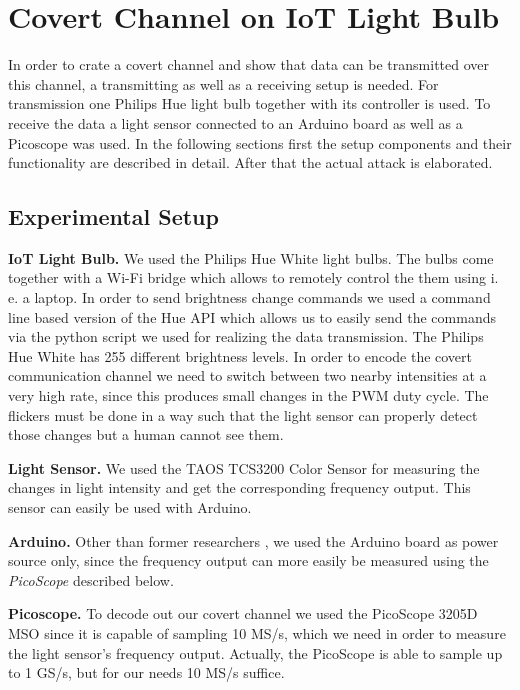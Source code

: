 \section{Covert Channel on IoT Light Bulb}
\label{sec:experiment}

In order to crate a covert channel and show that data can be transmitted over this channel, a transmitting as well as a receiving setup is needed. For transmission one Philips Hue light bulb together with its controller is used. To receive the data a light sensor connected to an Arduino board as well as a Picoscope was used.\newline
In the following sections first the setup components and their functionality are described in detail. After that the actual attack is elaborated.\newline

\subsection{Experimental Setup}
\label{sec:setup}


\noindent\textbf{IoT Light Bulb.} We used the Philips Hue White light bulbs. The bulbs come together with a Wi-Fi bridge which allows to remotely control the them using i. e. a laptop. In order to send brightness change commands we used a command line based version of the Hue API which allows us to easily send the commands via the python script we used for realizing the data transmission. The Philips Hue White has 255 different brightness levels. %
In order to encode the covert communication channel we need to switch between two nearby intensities at a very high rate, since this produces small changes in the PWM duty cycle. The flickers must be done in a way such that the light sensor can properly detect those changes but a human cannot see them. \newline

\noindent\textbf{Light Sensor.} We used the TAOS TCS3200 Color Sensor for measuring the changes in light intensity and get the corresponding frequency output. This sensor can easily be used with Arduino. \newline 

\noindent\textbf{Arduino.} Other than former researchers \cite{Ronen:2016:EFAIDCSL}, we used the Arduino board as power source only, since the frequency output can more easily be measured using the \textit{PicoScope} described below. \newline

\noindent\textbf{Picoscope.} To decode out our covert channel we used the PicoScope 3205D MSO since it is capable of sampling 10 MS/s, which we need in order to measure the light sensor's frequency output. Actually, the PicoScope is able to sample up to 1 GS/s, but for our needs 10 MS/s suffice.

